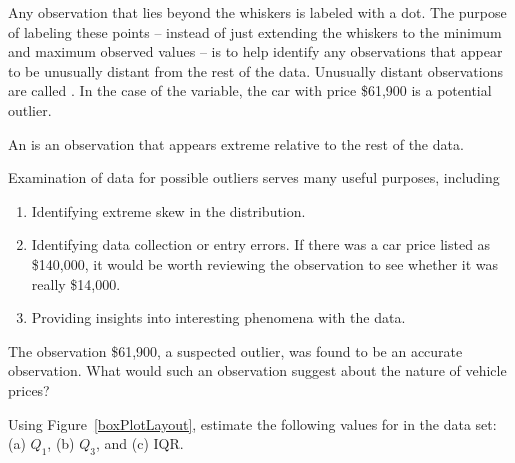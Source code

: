 Any observation that lies beyond the whiskers is labeled with a dot. The purpose of labeling these points -- instead of just extending the whiskers to the minimum and maximum observed values -- is to help identify any observations that appear to be unusually distant from the rest of the data. Unusually distant observations are called . In the case of the  variable, the car with price \$61,900 is a potential outlier.

\begin{termBox}{
An  is an observation that appears extreme relative to the rest of the data.}
\end{termBox}


\begin{tipBox}{
Examination of data for possible outliers serves many useful purposes, including\vspace{-2mm}
\begin{enumerate}
\setlength{\itemsep}{0mm}
\item Identifying extreme skew in the distribution.
\item Identifying data collection or entry errors. If there was a car price listed as \$140,000, it would be worth reviewing the observation to see whether it was really \$14,000.
\item Providing insights into interesting phenomena with the data.
\end{enumerate}}
\end{tipBox}

\begin{exercise}
The observation \$61,900, a suspected outlier, was found to be an accurate observation. What would such an observation suggest about the nature of vehicle prices?
\end{exercise}

\begin{exercise}
Using Figure~\vref{boxPlotLayout}, estimate the following values for  in the  data set: (a) $Q_1$, (b) $Q_3$, and (c) IQR.
\end{exercise}

